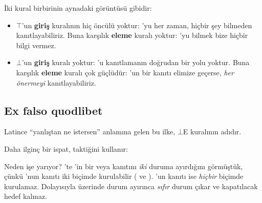 \noindent İki kural birbirinin aynadaki görüntüsü gibidir:

\begin{itemize}
  \item $\top$'un \textbf{giriş} kuralının hiç öncülü yoktur: 'yu
        her zaman, hiçbir şey bilmeden kanıtlayabiliriz. Buna karşılık
        \textbf{eleme} kuralı yoktur: 'yu bilmek bize hiçbir bilgi
        vermez.
  \item $\bot$'un \textbf{giriş} kuralı yoktur: 'u kanıtlamanın
        doğrudan bir yolu yoktur. Buna karşılık \textbf{eleme} kuralı
        çok güçlüdür: 'un bir kanıtı elimize geçerse, \emph{her
        önermeyi} kanıtlayabiliriz.
\end{itemize}


\subsection{Ex falso quodlibet}

Latince ``yanlıştan ne istersen'' anlamına gelen bu ilke, $\bot$E
kuralının adıdır.


\noindent Daha ilginç bir ispat,  taktiğini kullanır:


Neden işe yarıyor? 'te 'in bir veya
kanıtını \emph{iki} duruma ayırdığını görmüştük, çünkü 'nun
kanıtı iki biçimde kurulabilir ( ve ). 'un
kanıtı ise \emph{hiçbir} biçimde kurulamaz. Dolayısıyla 
üzerinde durum ayırınca \emph{sıfır} durum çıkar ve kapatılacak hedef
kalmaz.

